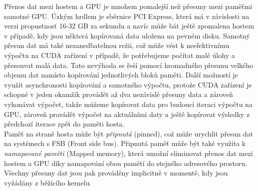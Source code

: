 Přenos dat mezi hostem a GPU je mnohem pomalejší než přesuny mezi paměťmi samotné GPU. Úzkým hrdlem je sběrnice PCI Express, která má v závislosti na verzi propustnost 16-32 GB za sekundu a navíc může bát ještě zpomalena hostem v případě, kdy jsou některá kopírovaná data uložena na pevném disku. Samotný přesun dat má také nezanedbatelnou režii, což může vést k neefektivnímu výpočtu na CUDA zařízení v případě, že potřebujeme počítat malé úlohy a přesouvat malá data. Tato nevýhoda se řeší pomocí hromadného přesunu velkého objemu dat namísto kopírování jednotlivých bloků paměti. Další možností je využít asynchronosti kopírování a samotného výpočtu, protože CUDA zařízení je schopné v jeden okamžik provádět až dva nezávislé přesuny data a zároveň vykonávat výpočet, takže můžeme kopírovat data pro budoucí iteraci výpočtu na GPU, zároveň provádět výpočet na aktuálními daty a ještě kopírovat výsledky z předchozí iterace zpět do paměti hosta.\\

Paměť na straně hosta může být \textit{připnutá} (pinned), což může urychlit přesun dat na systémech s FSB (Front side bus). Připnutá paměť může být také využita k \textit{namapované paměti} (Mapped memory), která umožní eliminovat přenos dat mezi hostem a GPU díky namapování obou pamětí do stejného adresového prostoru. Všechny přesuny dat jsou pak prováděny implicitně v momentě, kdy jsou vyžádány z běžícího kernelu.